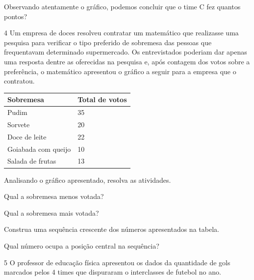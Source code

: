 Observando atentamente o gráfico, podemos concluir que o time C fez quantos pontos?


\pagebreak

\num{4} Um empresa de doces resolveu contratar um matemático que realizasse
uma pesquisa para verificar o tipo preferido de sobremesa das pessoas
que frequentavam determinado supermercado. Os entrevistados poderiam dar
apenas uma resposta dentre as oferecidas na pesquisa e, após contagem dos
votos sobre a preferência, o matemático apresentou o gráfico a seguir
para a empresa que o contratou.

\begin{longtable}[]{@{}ll@{}}
\toprule
Sobremesa & Total de votos\tabularnewline
\midrule
\endhead
Pudim & 35\tabularnewline
Sorvete & 20\tabularnewline
Doce de leite & 22\tabularnewline
Goiabada com queijo & 10\tabularnewline
Salada de frutas & 13\tabularnewline
\bottomrule
\end{longtable}

Analisando o gráfico apresentado, resolva as atividades.

\begin{escolha} \enlargethispage{\baselineskip}
\item
  Qual a sobremesa menos votada?


\item
  Qual a sobremesa mais votada?


\item
  Construa uma sequência crescente dos números apresentados na tabela.


\item Qual número ocupa a posição central na sequência?

\end{escolha}

\pagebreak
\num{5} O professor de educação física apresentou os dados da quantidade de
gols marcados pelos 4 times que dispuraram o interclasses de futebol no
ano.

